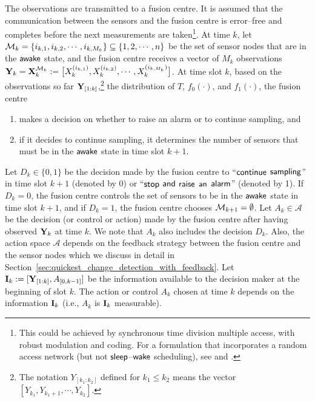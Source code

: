 \documentclass[journal]{IEEEtran}
\newcommand{\sleep}{{${\sf sleep }$}}
\newcommand{\wake}{{${\sf awake }$}}
\begin{document}
The observations are transmitted to a fusion centre. It is assumed that
the communication between the sensors and the fusion centre is
error--free and completes before the next measurements are
taken\footnote{This could be achieved by synchronous time division
multiple access, with robust modulation and coding. For a formulation
that incorporates a random access network (but not \sleep--${\sf wake}$
scheduling), see \cite{secon} and
\cite{wsn.premkumar-etal10det-over-mac}.}. At time $k$, let ${\cal M}_k
= \{i_{k,1}, i_{k,2}, \cdots, i_{k,M_k}\} \subseteq \{1,2,\cdots,n\}$ be
the set of sensor nodes that are in the {\wake} state, and the fusion
centre receives a vector of $M_k$ observations ${\bf Y}_k = {\bf
X}^{{\cal M}_k}_k := \big[X_k^{(i_{k,1})}, X_k^{(i_{k,2})}, \cdots,
X_k^{(i_{k,M_k})}\big]$. At time slot $k$, based on the observations so
far ${\bf Y}_{[1:k]}$,\footnote{The notation $Y_{[k_1:k_2]}$ 
defined for $k_1 \leq k_2$ means the
vector $[Y_{k_1}, Y_{k_1+1}, \cdots, Y_{k_2}]$. } the distribution of $T$, $f_0(\cdot)$, and
$f_1(\cdot)$, the fusion centre  
\begin{enumerate}
\item makes a decision on whether to raise an alarm or to continue 
      sampling, and 
\item if it decides to continue sampling, it determines the number of 
      sensors that must be in the {\wake} state in time slot $k+1$.
\end{enumerate}
Let $D_k \in \{0, 1\}$ be the decision made by the fusion centre to
``${\sf continue}$ ${\sf sampling}$'' in time slot $k+1$ (denoted by
0) or ``${\sf stop}$ ${\sf and}$ ${\sf raise}$ ${\sf an}$ ${\sf
alarm}$'' (denoted by 1). If $D_k = 0$, the fusion centre controls the
set of sensors to be in the {\wake} state in time slot $k+1$, and if
$D_k = 1$, the fusion centre chooses ${\cal M}_{k+1} = \emptyset$.  Let
$A_k \in \mathcal{A}$ be the decision (or control or action) made by the
fusion centre after having observed ${\bf Y}_k$ at time $k$. We note
that $A_k$ also includes the decision $D_k$. Also, the action space
$\mathcal{A}$ depends on the feedback strategy between the fusion centre
and the sensor nodes which we discuss in detail in
Section~\ref{sec:quickest_change_detection_with_feedback}. Let ${\bf
I}_k := [{\bf Y}_{[1:k]}, A_{[0,k-1]}]$ be the information available to
the decision maker at the beginning of slot $k$. The action or control
$A_k$ chosen at time $k$ depends on the information ${\bf I}_k$ (i.e.,
$A_k$ is ${\bf I}_k$ measurable).
\end{document}
